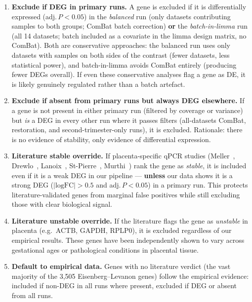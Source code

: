 \documentclass[11pt,a4paper]{article}
\begin{document}
\begin{enumerate}
  \item \textbf{Exclude if DEG in primary runs.}
        A gene is excluded if it is differentially expressed
        (adj.\,$P < 0.05$) in the \emph{balanced} run (only datasets
        contributing samples to both groups; ComBat batch correction)
        \textbf{or} the \emph{batch-in-limma} run (all 14 datasets;
        batch included as a covariate in the limma design matrix, no
        ComBat).  Both are conservative approaches: the balanced
        run uses only datasets with samples on both sides of the
        contrast (fewer datasets, less statistical power), and
        batch-in-limma avoids ComBat entirely (producing fewer DEGs
        overall).  If even these conservative analyses flag a gene as
        DE, it is likely genuinely regulated rather than a batch
        artefact.

  \item \textbf{Exclude if absent from primary runs but always DEG
        elsewhere.}
        If a gene is not present in either primary run (filtered by
        coverage or variance) but \emph{is} a DEG in every other run
        where it passes filters (all-datasets ComBat, restoration, and
        second-trimester-only runs), it is excluded.  Rationale: there
        is no evidence of stability, only evidence of differential
        expression.

  \item \textbf{Literature stable override.}
        If placenta-specific qPCR studies
        (Meller~\cite{meller2005}, Drewlo~\cite{drewlo2012},
        Lanoix~\cite{lanoix2012}, St-Pierre~\cite{stpierre2017},
        Murthi~\cite{murthi2008}) rank the gene as \emph{stable}, it
        is included even if it is a weak DEG in our pipeline ---
        \textbf{unless} our data shows it is a strong DEG
        ($|\text{logFC}| > 0.5$ and adj.\,$P < 0.05$) in a primary
        run.  This protects literature-validated genes from marginal
        false positives while still excluding those with clear
        biological signal.

  \item \textbf{Literature unstable override.}
        If the literature flags the gene as \emph{unstable} in
        placenta (e.g.\ ACTB, GAPDH, RPLP0), it is excluded
        regardless of our empirical results.  These genes have been
        independently shown to vary across gestational ages or
        pathological conditions in placental tissue.

  \item \textbf{Default to empirical data.}
        Genes with no literature verdict (the vast majority of the
        3{,}505 Eisenberg--Levanon genes) follow the empirical
        evidence: included if non-DEG in all runs where present,
        excluded if DEG or absent from all runs.
\end{enumerate}
\end{document}
